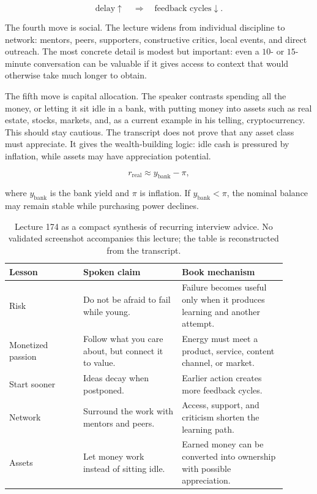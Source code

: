 \documentclass[11pt,oneside]{book}
\begin{document}
\begin{equation}
\text{delay}\uparrow
\quad\Longrightarrow\quad
\text{feedback cycles}\downarrow.
\end{equation}

The fourth move is social. The lecture widens from individual discipline to network: mentors, peers, supporters, constructive critics, local events, and direct outreach. The most concrete detail is modest but important: even a \(10\)- or \(15\)-minute conversation can be valuable if it gives access to context that would otherwise take much longer to obtain.

The fifth move is capital allocation. The speaker contrasts spending all the money, or letting it sit idle in a bank, with putting money into assets such as real estate, stocks, markets, and, as a current example in his telling, cryptocurrency. This should stay cautious. The transcript does not prove that any asset class must appreciate. It gives the wealth-building logic: idle cash is pressured by inflation, while assets may have appreciation potential.

\begin{equation}
r_{\mathrm{real}}\approx y_{\mathrm{bank}}-\pi,
\end{equation}

where \(y_{\mathrm{bank}}\) is the bank yield and \(\pi\) is inflation. If \(y_{\mathrm{bank}}<\pi\), the nominal balance may remain stable while purchasing power declines.

\begin{table}
\centering
\begin{tabular}{p{0.24\linewidth} p{0.32\linewidth} p{0.34\linewidth}}
\hline
Lesson & Spoken claim & Book mechanism \\
\hline
Risk & Do not be afraid to fail while young. & Failure becomes useful only when it produces learning and another attempt. \\
Monetized passion & Follow what you care about, but connect it to value. & Energy must meet a product, service, content channel, or market. \\
Start sooner & Ideas decay when postponed. & Earlier action creates more feedback cycles. \\
Network & Surround the work with mentors and peers. & Access, support, and criticism shorten the learning path. \\
Assets & Let money work instead of sitting idle. & Earned money can be converted into ownership with possible appreciation. \\
\hline
\end{tabular}
\caption{Lecture 174 as a compact synthesis of recurring interview advice. No validated screenshot accompanies this lecture; the table is reconstructed from the transcript.}
\end{table}
\end{document}
